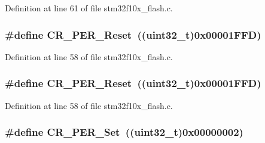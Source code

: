 Definition at line 61 of file stm32f10x\+\_\+flash.\+c.

\subsubsection[{\texorpdfstring{C\+R\+\_\+\+P\+E\+R\+\_\+\+Reset}{CR_PER_Reset}}]{\setlength{\rightskip}{0pt plus 5cm}\#define C\+R\+\_\+\+P\+E\+R\+\_\+\+Reset~(({\bf uint32\+\_\+t})0x00001\+F\+F\+D)}\hypertarget{group___f_l_a_s_h___private___defines_gad564767c401a1a9c36b71342448fd256}{}\label{group___f_l_a_s_h___private___defines_gad564767c401a1a9c36b71342448fd256}


Definition at line 58 of file stm32f10x\+\_\+flash.\+c.

\subsubsection[{\texorpdfstring{C\+R\+\_\+\+P\+E\+R\+\_\+\+Reset}{CR_PER_Reset}}]{\setlength{\rightskip}{0pt plus 5cm}\#define C\+R\+\_\+\+P\+E\+R\+\_\+\+Reset~(({\bf uint32\+\_\+t})0x00001\+F\+F\+D)}\hypertarget{group___f_l_a_s_h___private___defines_gad564767c401a1a9c36b71342448fd256}{}\label{group___f_l_a_s_h___private___defines_gad564767c401a1a9c36b71342448fd256}


Definition at line 58 of file stm32f10x\+\_\+flash.\+c.

\subsubsection[{\texorpdfstring{C\+R\+\_\+\+P\+E\+R\+\_\+\+Set}{CR_PER_Set}}]{\setlength{\rightskip}{0pt plus 5cm}\#define C\+R\+\_\+\+P\+E\+R\+\_\+\+Set~(({\bf uint32\+\_\+t})0x00000002)}\hypertarget{group___f_l_a_s_h___private___defines_ga6e5e45c62f559102546b40de50c700bd}{}\label{group___f_l_a_s_h___private___defines_ga6e5e45c62f559102546b40de50c700bd}


